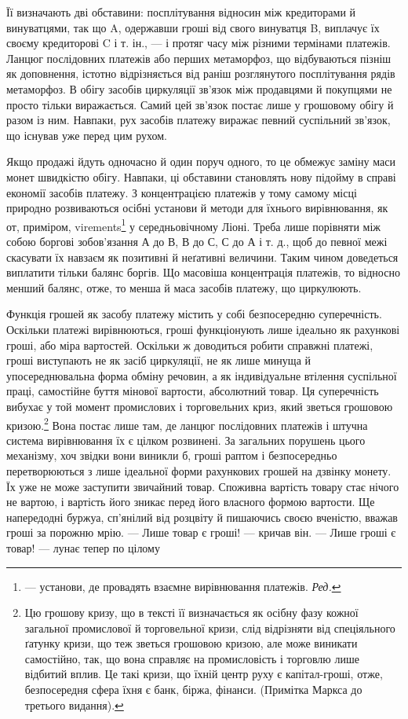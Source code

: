 \parcont{}  %
Її визначають дві обставини: посплітування відносин між кредиторами й винуватцями, так що A,
одержавши гроші від свого винуватця B, виплачує їх своєму кредиторові C і т. ін., — і протяг часу
між різними термінами платежів. Ланцюг послідовних платежів або перших метаморфоз, що відбуваються
пізніш як доповнення, істотно відрізняється від раніш розглянутого посплітування рядів метаморфоз. В
обігу засобів циркуляції зв’язок між продавцями й покупцями не просто тільки виражається. Самий цей
зв’язок постає лише у грошовому обігу й разом із ним. Навпаки, рух засобів платежу виражає певний
суспільний зв’язок, що існував уже перед цим рухом.

Якщо продажі йдуть одночасно й один поруч одного, то це обмежує заміну маси монет швидкістю обігу.
Навпаки, ці обставини становлять нову підойму в справі економії засобів платежу. З концентрацією
платежів у тому самому місці природно розвиваються осібні установи й методи для їхнього
вирівнювання, як от, приміром, virements\footnote*{
— установи, де провадять взаємне вирівнювання платежів. \emph{Ред.}
} у середньовічному Ліоні. Треба лише порівняти між собою
боргові зобов’язання А до В, В до С, С до А і т. д., щоб до певної межі скасувати їх навзаєм як
позитивні й неґативні величини. Таким чином доведеться виплатити тільки балянс боргів. Що масовіша
концентрація платежів, то відносно менший балянс, отже, то менша й маса засобів платежу, що
циркулюють.

Функція грошей як засобу платежу містить у собі безпосередню суперечність. Оскільки платежі
вирівнюються, гроші функціонують лише ідеально як рахункові гроші, або міра вартостей. Оскільки ж
доводиться робити справжні платежі, гроші
виступають не як засіб циркуляції, не як лише минуща й упосереднювальна форма обміну речовин, а як
індивідуальне втілення суспільної праці, самостійне буття мінової вартости, абсолютний товар. Ця
суперечність вибухає у той момент промислових і торговельних криз, який зветься грошовою кризою.\footnote{
Цю грошову кризу, що в тексті її визначається як осібну фазу кожної загальної промислової й
торговельної кризи, слід відрізняти від спеціяльного ґатунку кризи, що теж зветься грошовою кризою,
але може виникати самостійно, так, що вона справляє на промисловість і торговлю лише відбитий вплив.
Це такі кризи, що їхній центр руху є капітал-гроші, отже, безпосередня сфера їхня є банк, біржа,
фінанси. (Примітка Маркса до третього видання).
}
Вона постає лише там, де ланцюг послідовних платежів і штучна система вирівнювання їх є цілком
розвинені. За загальних порушень цього механізму, хоч звідки вони виникли б, гроші раптом і
безпосередньо перетворюються з лише ідеальної форми рахункових грошей на дзвінку монету. Їх уже не
може заступити звичайний товар. Споживна вартість товару стає нічого не вартою, і вартість його
зникає перед його власного формою вартости. Ще напередодні буржуа, сп’янілий від розцвіту й
пишаючись своєю вченістю, вважав гроші за порожню мрію. — Лише товар є гроші! — кричав він. — Лише
гроші є товар! — лунає тепер по цілому
\parbreak{}  %
